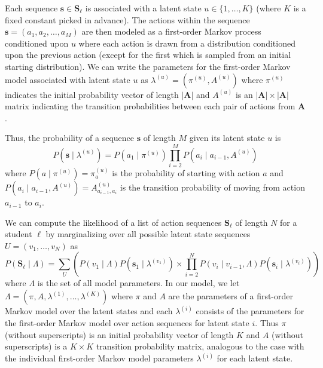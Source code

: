 Each sequence $\mathbf{s} \in \mathbf{S}_\ell$ is associated with a latent
state $u \in \{1,\ldots,K\}$ (where $K$ is a fixed constant picked in
advance). The actions within the sequence $\mathbf{s} = (a_1, a_2, \ldots,
a_M)$ are then modeled as a first-order Markov process conditioned upon $u$
where each action is drawn from a distribution conditioned upon the
previous action (except for the first which is sampled from an initial
starting distribution). We can write the parameters for the first-order
Markov model associated with latent state $u$ as $\lambda^{(u)} =
(\pi^{(u)}, A^{(u)})$ where $\pi^{(u)}$ indicates the initial probability
vector of length $|\mathbf{A}|$ and $A^{(u)}$ is an $|\mathbf{A}| \times
|\mathbf{A}|$ matrix indicating the transition probabilities between each
pair of actions from $\mathbf{A}$.

Thus, the probability of a sequence $\mathbf{s}$ of length $M$ given its
latent state $u$ is
\begin{equation}
  P(\mathbf{s} \mid \lambda^{(u)}) = P(a_1 \mid \pi^{(u)}) \prod_{i=2}^M P(a_i \mid
  a_{i-1}, A^{(u)})
\end{equation}
where $P(a \mid \pi^{(u)}) = \pi^{(u)}_a$ is the probability of starting
with action $a$ and $P(a_i \mid a_{i-1}, A^{(u)}) = A^{(u)}_{a_{i-1}, a_i}$
is the transition probability of moving from action $a_{i-1}$ to $a_{i}$.

We can compute the likelihood of a list of action sequences
$\mathbf{S}_\ell$ of length $N$ for a student $\ell$ by marginalizing over
all possible latent state sequences $U=(v_1, \ldots, v_N)$ as
\begin{equation}
  P(\mathbf{S}_\ell \mid \Lambda)
  = \sum_U \left(P(v_1 \mid \Lambda) P(\mathbf{s}_1 \mid \lambda^{(v_1)})
  \times \prod_{i=2}^N P(v_i \mid v_{i-1}, \Lambda)
  P(\mathbf{s}_i \mid \lambda^{(v_i)})\right)
\end{equation}
where $\Lambda$ is the set of all model parameters.  In our model, we let
$\Lambda = (\pi, A, \lambda^{(1)}, \ldots, \lambda^{(K)})$ where $\pi$ and
$A$ are the parameters of a first-order Markov model over the latent states
and each $\lambda^{(i)}$ consists of the parameters for the first-order
Markov model over action sequences for latent state $i$. Thus $\pi$
(without superscripts) is an initial probability vector of length $K$ and
$A$ (without superscripts) is a $K \times K$ transition probability matrix,
analogous to the case with the individual first-order Markov model
parameters $\lambda^{(i)}$ for each latent state.


